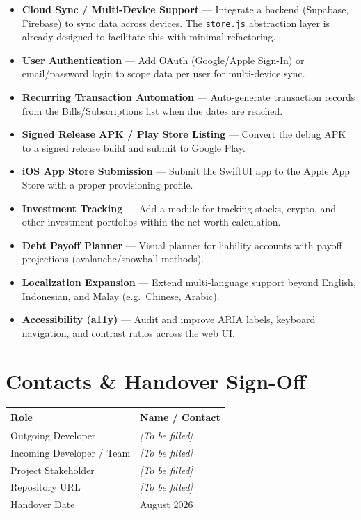 \documentclass[12pt, a4paper]{article}
\begin{document}
\begin{itemize}[leftmargin=1.5em, itemsep=4pt]
  \item \textbf{Cloud Sync / Multi-Device Support} --- Integrate a backend (Supabase, Firebase) to sync data across devices. The \texttt{store.js} abstraction layer is already designed to facilitate this with minimal refactoring.
  \item \textbf{User Authentication} --- Add OAuth (Google/Apple Sign-In) or email/password login to scope data per user for multi-device sync.
  \item \textbf{Recurring Transaction Automation} --- Auto-generate transaction records from the Bills/Subscriptions list when due dates are reached.
  \item \textbf{Signed Release APK / Play Store Listing} --- Convert the debug APK to a signed release build and submit to Google Play.
  \item \textbf{iOS App Store Submission} --- Submit the SwiftUI app to the Apple App Store with a proper provisioning profile.
  \item \textbf{Investment Tracking} --- Add a module for tracking stocks, crypto, and other investment portfolios within the net worth calculation.
  \item \textbf{Debt Payoff Planner} --- Visual planner for liability accounts with payoff projections (avalanche/snowball methods).
  \item \textbf{Localization Expansion} --- Extend multi-language support beyond English, Indonesian, and Malay (e.g.\ Chinese, Arabic).
  \item \textbf{Accessibility (a11y)} --- Audit and improve ARIA labels, keyboard navigation, and contrast ratios across the web UI.
\end{itemize}

\section{Contacts \& Handover Sign-Off}

\vspace{0.5cm}

\begin{longtable}{L{5cm} L{9.5cm}}
  \toprule
  \textbf{Role} & \textbf{Name / Contact} \\
  \midrule
  \endhead
  Outgoing Developer & \textit{[To be filled]} \\[4pt]
  Incoming Developer / Team & \textit{[To be filled]} \\[4pt]
  Project Stakeholder & \textit{[To be filled]} \\[4pt]
  Repository URL & \textit{[To be filled]} \\[4pt]
  Handover Date & August 2026 \\
  \bottomrule
\end{longtable}
\end{document}
